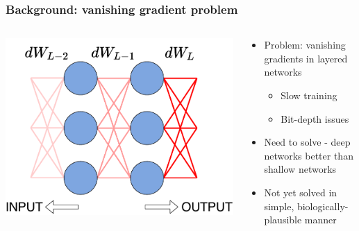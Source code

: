 \documentclass[pdf]{beamer}
\begin{document}
\begin{frame}
\frametitle{Background: vanishing gradient problem}
\begin{columns}
	\begin{column}{.5\textwidth}
		\includegraphics[width=\textwidth]{figures/vgp_illustration.pdf}
	\end{column}
	\begin{column}{.5\textwidth}
		\begin{itemize}
			\item<1-> Problem: vanishing gradients in layered networks
			\vspace{-4mm}\begin{itemize}
				\item<2-> Slow training
				\item<3-> Bit-depth issues
			\end{itemize}
			\item<4-> Need to solve - deep networks better than shallow networks
			\item<5-> Not yet solved in simple, biologically-plausible manner
		\end{itemize}
	\end{column}
\end{columns}
\end{frame}
\end{document}
